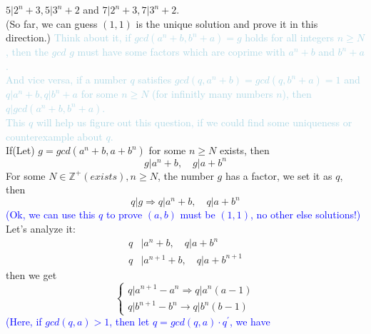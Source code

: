 \documentclass{Math_Note}
\begin{document}
\begin{sol}
{$5\vert 2^{n}+3, 5\vert 3^{n}+2$ and $7\vert 2^{n}+3, 7\vert 3^{n}+2$.\\
(So far, we can guess $\left(1,1\right)$ is the unique solution and prove it in this direction.)
}
\newline
\marginpar{\textcolor{red}{idea}}
\textcolor{lightblue}{
Think about it, if $gcd\left(a^{n}+b,b^{n}+a\right) = g$ holds for all integers $n \geq N$, then the $gcd$ $g$ must have some factors which are coprime 
with $a^{n}+b$ and $b^{n}+a$.\\ 
And vice versa, if a number $q$ satisfies $gcd\left(q,a^{n}+b\right)=gcd\left(q,b^{n}+a\right)=1$ and $q\vert a^{n}+b, q\vert b^{n}+a$ for some $n\geq N$
(for infinitly many numbers $n$), then $q\vert gcd\left(a^{n}+b,b^{n}+a\right)$.\\
This $q$ will help us figure out this question, if we could find some uniqueness or counterexample about $q$.\\
}
\newline
\marginpar{\textcolor{red}{solution}}
If(Let) $g=gcd\left(a^{n}+b,a+b^{n}\right)$ for some $n\geq N$ exists, then 
\begin{equation}
    g\vert a^{n}+b,\quad g\vert a+b^{n}
\end{equation}
For some $N\in\mathbb{Z}^{+} (exists), n\geq N$, the number $g$ has a factor, we set it as $q$, then
\begin{equation}
    q\vert g \Longrightarrow q\vert a^{n}+b,\quad q\vert a+b^{n}
\end{equation}
\textcolor{blue}{
(Ok, we can use this $q$ to prove $\left(a,b\right)$ must be $\left(1,1\right)$, no other else solutions!)
}
Let's analyze it: 
\begin{equation}
    \begin{split}
        q &\vert a^{n}+b,\quad q\vert a+b^{n}\\
        q &\vert a^{n+1}+b,\quad q\vert a+b^{n+1}
    \end{split}
\end{equation}
then we get 
\begin{equation}
    \begin{cases}
        q\vert a^{n+1}-a^{n} \Longrightarrow q\vert a^{n}\left(a-1\right)\\
        q\vert b^{n+1}-b^{n} \longrightarrow q\vert b^{n}\left(b-1\right)
    \end{cases}
\end{equation}
\textcolor{blue}{
(Here, if $gcd\left(q,a\right)>1$, then let $q=gcd\left(q,a\right)\cdot q^{'}$, we have 
}
\end{sol}
\end{document}
